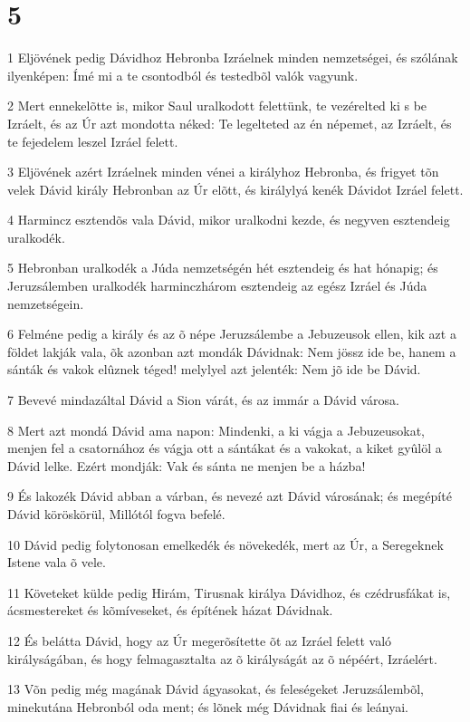 \chapter{5}

\par 1 Eljövének pedig Dávidhoz Hebronba Izráelnek minden nemzetségei, és szólának ilyenképen: Ímé mi a te csontodból és testedbõl valók vagyunk.
\par 2 Mert ennekelõtte is, mikor Saul uralkodott felettünk, te vezérelted ki s be Izráelt, és az Úr azt mondotta néked: Te legelteted az én népemet, az Izráelt, és te fejedelem leszel Izráel felett.
\par 3 Eljövének azért Izráelnek minden vénei a királyhoz Hebronba, és frigyet tõn velek Dávid király Hebronban az Úr elõtt, és királylyá kenék Dávidot Izráel felett.
\par 4 Harmincz esztendõs vala Dávid, mikor uralkodni kezde, és negyven esztendeig uralkodék.
\par 5 Hebronban uralkodék a Júda nemzetségén hét esztendeig és hat hónapig; és Jeruzsálemben uralkodék harminczhárom esztendeig az egész Izráel és Júda nemzetségein.
\par 6 Felméne pedig a király és az õ népe Jeruzsálembe a Jebuzeusok ellen, kik azt a földet lakják vala, õk azonban azt mondák Dávidnak: Nem jössz ide be, hanem a sánták és vakok elûznek téged! melylyel azt jelenték: Nem jõ ide be Dávid.
\par 7 Bevevé mindazáltal Dávid a Sion várát, és az immár a Dávid városa.
\par 8 Mert azt mondá Dávid ama napon: Mindenki, a ki vágja a Jebuzeusokat, menjen fel a csatornához és vágja ott a sántákat és a vakokat, a kiket  gyûlöl a Dávid lelke. Ezért mondják: Vak és sánta ne menjen be a házba!
\par 9 És lakozék Dávid abban a várban, és nevezé azt Dávid városának; és megépíté Dávid köröskörül, Millótól fogva befelé.
\par 10 Dávid pedig folytonosan emelkedék és növekedék, mert az Úr, a Seregeknek Istene vala õ vele.
\par 11 Követeket külde pedig Hirám, Tirusnak királya Dávidhoz, és czédrusfákat is, ácsmestereket és kõmíveseket, és építének házat Dávidnak.
\par 12 És belátta Dávid, hogy az Úr megerõsítette õt az Izráel felett való királyságában, és hogy felmagasztalta az õ királyságát az õ népéért, Izráelért.
\par 13 Võn pedig még magának Dávid ágyasokat, és  feleségeket Jeruzsálembõl, minekutána Hebronból oda ment; és lõnek még Dávidnak fiai és leányai.
